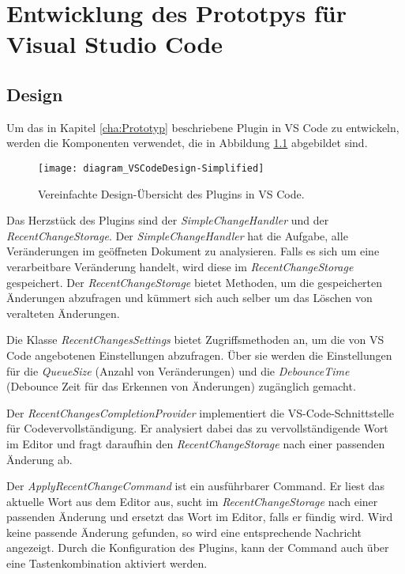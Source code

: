 \chapter{Entwicklung des Prototpys für Visual Studio Code}
\label{cha:EntwicklungVsCode}

\section{Design}
\label{sec:EntwicklungVsCode_Design}

Um das in Kapitel \ref{cha:Prototyp} beschriebene Plugin in VS Code
zu entwickeln, werden die Komponenten verwendet, die in 
Abbildung \ref{fig:diagram_VSCodeDesign-Simplified} abgebildet sind.
\begin{figure}
    \centering
    \texttt{[image: diagram\_VSCodeDesign-Simplified]}
    \caption{Vereinfachte Design-Übersicht des Plugins in  VS Code.}
    \label{fig:diagram_VSCodeDesign-Simplified}
\end{figure}  

Das Herzstück des Plugins sind der \emph{SimpleChangeHandler} und
der \emph{RecentChangeStorage}. Der \emph{SimpleChangeHandler} hat die Aufgabe,
alle Veränderungen im geöffneten Dokument zu analysieren. Falls es sich um
eine verarbeitbare Veränderung handelt, wird diese im \emph{RecentChangeStorage}
gespeichert. Der \emph{RecentChangeStorage} bietet Methoden, um die
gespeicherten Änderungen abzufragen und kümmert sich auch selber um das
Löschen von veralteten Änderungen.

Die Klasse \emph{RecentChangesSettings} bietet Zugriffsmethoden an,
um die von VS Code angebotenen Einstellungen abzufragen. Über sie
werden die Einstellungen für die \emph{QueueSize} (Anzahl von Veränderungen)
und die \emph{DebounceTime} (Debounce Zeit für das Erkennen von Änderungen)
zugänglich gemacht.

Der \emph{RecentChangesCompletionProvider} implementiert die VS-Code-Schnittstelle
für Codevervollständigung. Er analysiert dabei das zu vervollständigende Wort
im Editor und fragt daraufhin den \emph{RecentChangeStorage} nach einer passenden
Änderung ab.

Der \emph{ApplyRecentChangeCommand} ist ein ausführbarer Command. Er liest
das aktuelle Wort aus dem Editor aus, sucht im \emph{RecentChangeStorage}
nach einer passenden Änderung und ersetzt das Wort im Editor, falls
er fündig wird. Wird keine passende Änderung gefunden, so wird eine entsprechende
Nachricht angezeigt. Durch die Konfiguration des Plugins, kann der
Command auch über eine Tastenkombination aktiviert werden.

